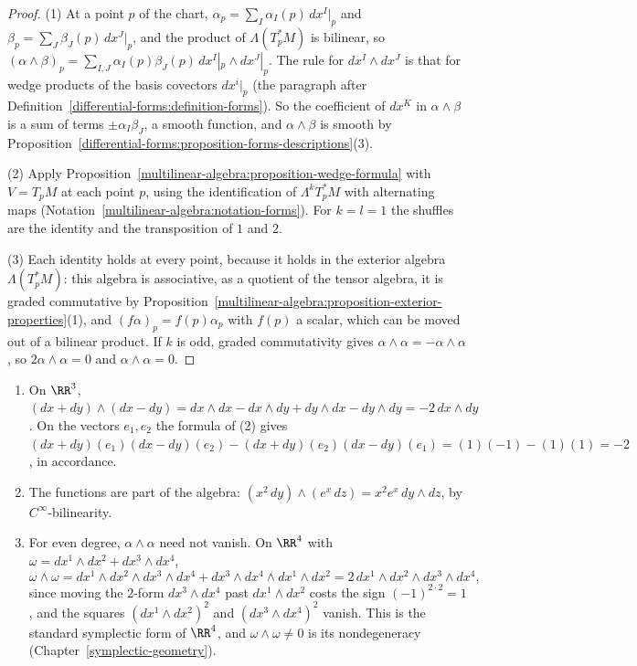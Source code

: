 \begin{proof}
(1) At a point $p$ of the chart, $\alpha_p = \sum_I\alpha_I(p)\,dx^I|_p$ and $\beta_p = \sum_J\beta_J(p)\,dx^J|_p$, and the product of $\Lambda(T_p^*M)$ is bilinear, so
$(\alpha \wedge \beta)_p = \sum_{I,J}\alpha_I(p)\beta_J(p)\,dx^I|_p \wedge dx^J|_p$. The rule for $dx^I \wedge dx^J$ is that for wedge products of the basis covectors $dx^i|_p$ (the paragraph after
Definition~\ref{differential-forms:definition-forms}). So the coefficient of $dx^K$ in $\alpha \wedge \beta$ is a sum of terms $\pm\alpha_I\beta_J$, a smooth function, and $\alpha \wedge \beta$ is smooth by
Proposition~\ref{differential-forms:proposition-forms-descriptions}(3).

(2) Apply Proposition~\ref{multilinear-algebra:proposition-wedge-formula} with $V = T_pM$ at each point $p$, using the identification of $\Lambda^kT_p^*M$ with alternating maps
(Notation~\ref{multilinear-algebra:notation-forms}). For $k = l = 1$ the shuffles are the identity and the transposition of $1$ and $2$.

(3) Each identity holds at every point, because it holds in the exterior algebra $\Lambda(T_p^*M)$: this algebra is associative, as a quotient of the tensor algebra, it is graded commutative by
Proposition~\ref{multilinear-algebra:proposition-exterior-properties}(1), and $(f\alpha)_p = f(p)\alpha_p$ with $f(p)$ a scalar, which can be moved out of a bilinear product. If $k$ is odd, graded commutativity gives
$\alpha \wedge \alpha = -\alpha \wedge \alpha$, so $2\alpha \wedge \alpha = 0$ and $\alpha \wedge \alpha = 0$.
\end{proof}

\begin{example}\label{differential-forms:example-wedge}
\begin{enumerate}
\item On $\RR^3$, $(dx + dy) \wedge (dx - dy) = dx \wedge dx - dx \wedge dy + dy \wedge dx - dy \wedge dy = -2\,dx \wedge dy$. On the vectors $e_1, e_2$ the formula of (2) gives
$(dx + dy)(e_1)(dx - dy)(e_2) - (dx + dy)(e_2)(dx - dy)(e_1) = (1)(-1) - (1)(1) = -2$, in accordance.
\item The functions are part of the algebra: $(x^2\,dy) \wedge (e^x\,dz) = x^2e^x\,dy \wedge dz$, by $C^\infty$-bilinearity.
\item For even degree, $\alpha \wedge \alpha$ need not vanish. On $\RR^4$ with $\omega = dx^1 \wedge dx^2 + dx^3 \wedge dx^4$,
\[
\omega \wedge \omega = dx^1 \wedge dx^2 \wedge dx^3 \wedge dx^4 + dx^3 \wedge dx^4 \wedge dx^1 \wedge dx^2 = 2\,dx^1 \wedge dx^2 \wedge dx^3 \wedge dx^4,
\]
since moving the $2$-form $dx^3 \wedge dx^4$ past $dx^1 \wedge dx^2$ costs the sign $(-1)^{2 \cdot 2} = 1$, and the squares $(dx^1 \wedge dx^2)^2$ and $(dx^3 \wedge dx^4)^2$ vanish. This is the standard symplectic form of
$\RR^4$, and $\omega \wedge \omega \neq 0$ is its nondegeneracy (Chapter~\ref{symplectic-geometry}).
\end{enumerate}
\end{example}

